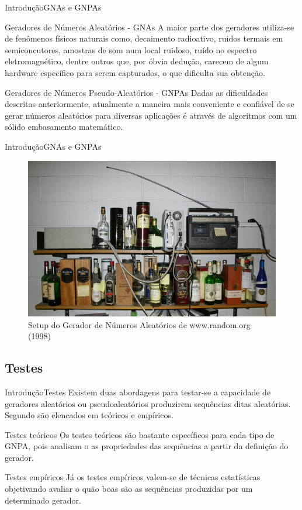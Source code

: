 \documentclass[10pt,xcolor={dvipsnames}]{beamer}
\begin{document}
\begin{frame}{Introdução}{GNAs e GNPAs}
	\begin{block}{Geradores de Números Aleatórios - GNAs}
		A maior parte dos geradores utiliza-se de fenômenos físicos naturais como, decaimento radioativo, ruidos termais em semiconcutores, amostras de som num local ruidoso, ruído no espectro eletromagnético, dentre outros que, por óbvia dedução, carecem de algum hardware específico para serem capturados, o que dificulta sua obtenção. 
	\end{block}
\pause
	\begin{block}{Geradores de Números Pseudo-Aleatórios - GNPAs}
		Dadas as dificuldades descritas anteriormente, atualmente a maneira mais conveniente e confiável de se gerar números aleatórios para diversas aplicações é através de algoritmos com um sólido embasamento matemático.
	\end{block}	
\end{frame}

\begin{frame}{Introdução}{GNAs e GNPAs}
	\begin{figure}[hbt]
		\centering
		\includegraphics[width=.7\linewidth]{random_org}
		\caption{Setup do Gerador de Números Aleatórios de www.random.org (1998)}\label{fig:random_org}
	\end{figure}
\end{frame}
\subsection{Testes}
\begin{frame}{Introdução}{Testes}
Existem duas abordagens para testar-se a capacidade de geradores aleatórios ou pseudoaleatórios produzirem sequências ditas aleatórias.
Segundo \cite{LEcuyer:92} são elencados em teóricos e empíricos.
\pause
\begin{block}{Testes teóricos}
	Os testes teóricos são bastante específicos para cada tipo de GNPA, pois analisam o as propriedades das sequências a partir da definição do gerador.
\end{block}
\pause
\begin{block}{Testes empíricos}
	Já os testes empíricos valem-se de técnicas estatísticas objetivando avaliar o quão boas são as sequências produzidas por um determinado gerador.
\end{block}	
\end{frame}
\end{document}
